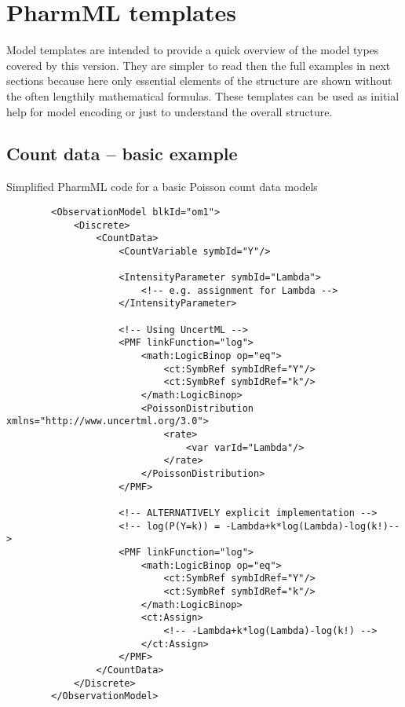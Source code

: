 \section{PharmML templates}
\label{sec:codeTemplates}

Model templates are intended to provide a quick overview of the model types covered by this 
\pharmml version. They are simpler to read then the full examples in next sections because
here only essential elements of the structure are shown without the often lengthily 
mathematical formulas. These templates can be used as initial help for model encoding
or just to understand the overall structure.

\subsection{Count data -- basic example}
Simplified PharmML code for a basic Poisson count data models
\lstset{language=XML}
\begin{lstlisting}
        <ObservationModel blkId="om1">
            <Discrete>
                <CountData>
                    <CountVariable symbId="Y"/>

                    <IntensityParameter symbId="Lambda">
                        <!-- e.g. assignment for Lambda -->
                    </IntensityParameter>
                    
                    <!-- Using UncertML -->
                    <PMF linkFunction="log">
                        <math:LogicBinop op="eq">
                            <ct:SymbRef symbIdRef="Y"/>
                            <ct:SymbRef symbIdRef="k"/>
                        </math:LogicBinop>
                        <PoissonDistribution xmlns="http://www.uncertml.org/3.0">
                            <rate>
                                <var varId="Lambda"/>
                            </rate>
                        </PoissonDistribution>
                    </PMF>
                    
                    <!-- ALTERNATIVELY explicit implementation -->
                    <!-- log(P(Y=k)) = -Lambda+k*log(Lambda)-log(k!)-->
                    <PMF linkFunction="log">
                        <math:LogicBinop op="eq">
                            <ct:SymbRef symbIdRef="Y"/>
                            <ct:SymbRef symbIdRef="k"/>
                        </math:LogicBinop>
                        <ct:Assign>
                            <!-- -Lambda+k*log(Lambda)-log(k!) -->
                        </ct:Assign>
                    </PMF>
                </CountData>
            </Discrete>
        </ObservationModel>
\end{lstlisting}


